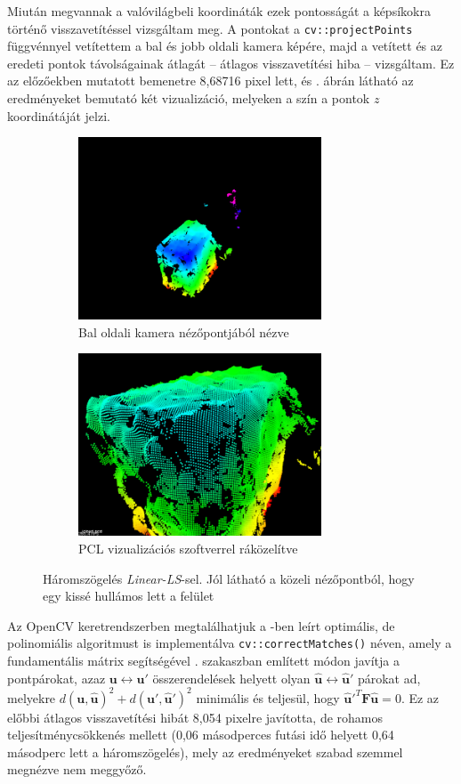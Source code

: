 Miután megvannak a valóvilágbeli koordináták ezek pontosságát a képsíkokra történő visszavetítéssel vizsgáltam meg. A pontokat a \texttt{cv::projectPoints} függvénnyel vetítettem a bal és jobb oldali kamera képére, majd a vetített és az eredeti pontok távolságainak átlagát -- átlagos visszavetítési hiba -- vizsgáltam. Ez az előzőekben mutatott bemenetre 8,68716 pixel lett, és . ábrán látható az eredményeket bemutató két vizualizáció, melyeken a szín a pontok $z$ koordinátáját jelzi.

\begin{figure}[tbh]
\centering
\begin{subfigure}[b]{.49\linewidth}
	\centering
	\includegraphics[width=205pt]{figures/visu_left.png}
	\caption{Bal oldali kamera nézőpontjából nézve \label{fig:cv-triangulation-a}}
  \end{subfigure}
\begin{subfigure}[b]{.49\linewidth}
	\centering
	\includegraphics[width=205pt]{figures/visu_pcl.png}
	\caption{PCL vizualizációs szoftverrel ráközelítve}
  \end{subfigure}
\caption{Háromszögelés \textit{Linear-LS}-sel. Jól látható a közeli nézőpontból, hogy egy kissé hullámos lett a felület \label{fig:cv-triangulation}}
\end{figure}

Az OpenCV keretrendszerben megtalálhatjuk a \cite{hartley-triangulation}-ben leírt optimális, de polinomiális algoritmust is implementálva \texttt{cv::correctMatches()} néven, amely a fundamentális mátrix segítségével . szakaszban említett módon javítja a pontpárokat, azaz $\mathbf{u} \leftrightarrow \mathbf{u}'$ összerendelések helyett olyan $\mathbf{\hat{u}} \leftrightarrow \mathbf{\hat{u}}'$ párokat ad, melyekre $d(\mathbf{u}, \mathbf{\hat{u}})^2 + d(\mathbf{u}', \mathbf{\hat{u}}')^2$ minimális és teljesül, hogy $\mathbf{\hat{u}}'^T \mathbf{F} \mathbf{\hat{u}} = 0$. Ez az előbbi átlagos visszavetítési hibát 8,054 pixelre javította, de rohamos teljesítménycsökkenés mellett (0,06 másodperces futási idő helyett 0,64 másodperc lett a háromszögelés), mely az eredményeket szabad szemmel megnézve nem meggyőző.


